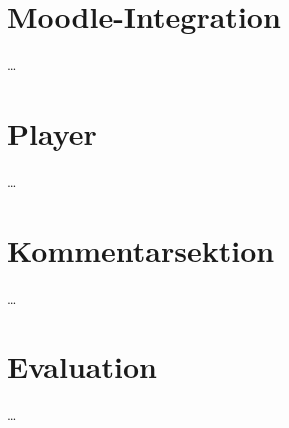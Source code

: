 \section{Moodle-Integration}
\dots


\section{Player}
\dots


\section{Kommentarsektion}
\dots


\section{Evaluation}
\dots